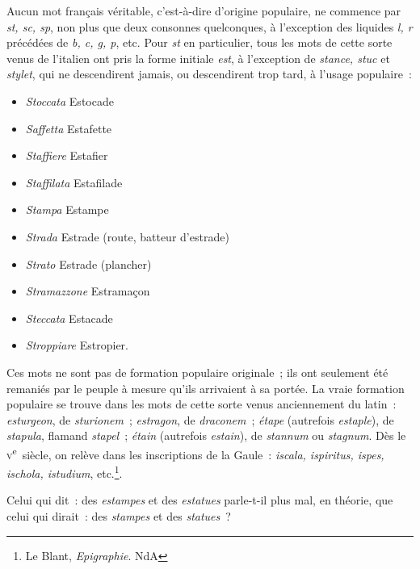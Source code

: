 \documentclass[french,twoside]{book} %
\def\mednobreak{\ifdim\lastskip<\medskipamount
  \removelastskip\nopagebreak\medskip\fi}
\newcommand{\labelblock}[1]{\medbreak{\noindent\color{rubric}\bfseries #1}\par\mednobreak}
\begin{document}
\labelblock{{\itshape Estatue}}

\noindent Aucun mot français véritable, c’est-à-dire d’origine populaire, ne commence par {\itshape st, sc, sp}, non plus que deux consonnes quelconques, à l’exception des liquides {\itshape l, r} précédées de {\itshape b, c, g, p}, etc. Pour {\itshape st} en particulier, tous les mots de cette sorte venus de l’italien ont pris la forme initiale {\itshape est}, à l’exception de {\itshape stance, stuc} et {\itshape stylet}, qui ne descendirent jamais, ou descendirent trop tard, à l’usage populaire :\par

\begin{itemize}[itemsep=0pt,]
\item {\itshape Stoccata} Estocade
\item {\itshape Saffetta} Estafette
\item {\itshape Staffiere} Estafier
\item {\itshape Staffilata} Estafilade
\item {\itshape Stampa} Estampe
\item {\itshape Strada} Estrade (route, batteur d’estrade)
\item {\itshape Strato} Estrade (plancher)
\item {\itshape Stramazzone} Estramaçon
\item {\itshape Steccata} Estacade
\item {\itshape Stroppiare} Estropier.
\end{itemize}

\noindent Ces mots ne sont pas de formation populaire originale ; ils ont seulement été remaniés par le peuple à mesure qu’ils arrivaient à sa portée. La vraie formation populaire se trouve dans les mots de cette sorte venus anciennement du latin : {\itshape esturgeon}, de {\itshape sturionem} ; {\itshape estragon}, de {\itshape draconem} ; {\itshape étape} (autrefois {\itshape estaple}), de {\itshape stapula}, flamand {\itshape stapel} ; {\itshape étain} (autrefois {\itshape estain}), de {\itshape stannum} ou {\itshape stagnum}. Dès le \textsc{v}\textsuperscript{e} siècle, on relève dans les inscriptions de la Gaule : {\itshape iscala, ispiritus, ispes, ischola, istudium}, etc.\footnote{ Le Blant, {\itshape Epigraphie}. NdA}.\par
\par
Celui qui dit : des {\itshape estampes} et des {\itshape estatues} parle-t-il plus mal, en théorie, que celui qui dirait : des {\itshape stampes} et des {\itshape statues} ?\par
\end{document}
